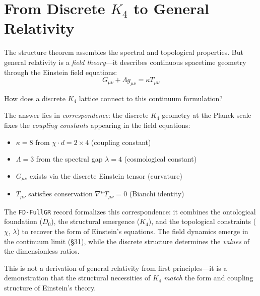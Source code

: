 \documentclass[11pt,a4paper]{book}
\begin{document}
\section{From Discrete \texorpdfstring{$K_4$}{K4} to General Relativity}

The structure theorem assembles the spectral and topological properties. But general 
relativity is a \emph{field theory}—it describes continuous spacetime geometry through 
the Einstein field equations:
\[
G_{\mu\nu} + \Lambda g_{\mu\nu} = \kappa T_{\mu\nu}
\]

How does a discrete $K_4$ lattice connect to this continuum formulation?

The answer lies in \emph{correspondence}: the discrete $K_4$ geometry at the Planck scale 
fixes the \emph{coupling constants} appearing in the field equations:
\begin{itemize}
\item $\kappa = 8$ from $\chi \cdot d = 2 \times 4$ (coupling constant)
\item $\Lambda = 3$ from the spectral gap $\lambda = 4$ (cosmological constant)
\item $G_{\mu\nu}$ exists via the discrete Einstein tensor (curvature)
\item $T_{\mu\nu}$ satisfies conservation $\nabla^\mu T_{\mu\nu} = 0$ (Bianchi identity)
\end{itemize}

The \texttt{FD-FullGR} record formalizes this correspondence: it combines the ontological 
foundation ($D_0$), the structural emergence ($K_4$), and the topological constraints 
($\chi$, $\lambda$) to recover the form of Einstein's equations. The field dynamics 
emerge in the continuum limit (§31), while the discrete structure determines the 
\emph{values} of the dimensionless ratios.

This is not a derivation of general relativity from first principles—it is a 
demonstration that the structural necessities of $K_4$ \emph{match} the form and 
coupling structure of Einstein's theory.
\end{document}
